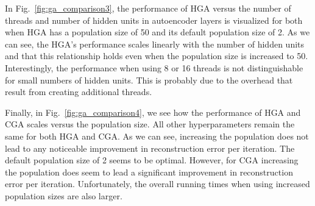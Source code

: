 In Fig.~\ref{fig:ga_comparison3}, the performance of HGA versus the number of threads and number of hidden units in autoencoder layers is visualized for both when HGA has a population size of 50 and its default population size of 2. As we can see, the HGA's performance scales linearly with the number of hidden units and that this relationship holds even when the population size is increased to 50. Interestingly, the performance when using 8 or 16 threads is not distinguishable for small numbers of hidden units. This is probably due to the overhead that result from creating additional threads.

Finally, in Fig.~\ref{fig:ga_comparison4}, we see how the performance of HGA and CGA scales versus the population size. All other hyperparameters remain the same for both HGA and CGA. As we can see, increasing the population does not lead to any noticeable improvement in reconstruction error per iteration. The default population size of 2 seems to be optimal. However, for CGA increasing the population does seem to lead a significant improvement in reconstruction error per iteration. Unfortunately, the overall running times when using increased population sizes are also larger. 


\FloatBarrier
